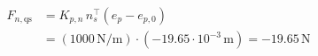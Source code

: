 \documentclass[border=3pt]{standalone}
\begin{document}
{\fontsize{20}{25}\selectfont \color{black}$\displaystyle
\begin{aligned}
F_{n,\mathrm{qs}}&=K_{p,n}\,n_s^\top(e_p-e_{p,0})\\[2pt]
&=\left(1000\,\mathrm{N/m}\right)\cdot\left(-19.65\cdot10^{-3}\,\mathrm{m}\right)
=-19.65\,\mathrm{N}
\end{aligned}$}
\end{document}
